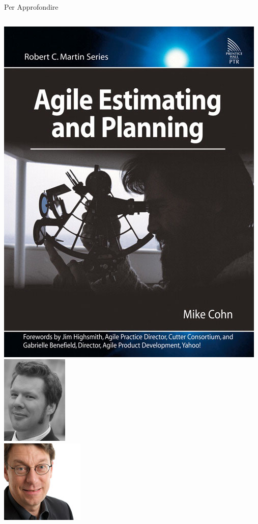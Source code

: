 \begin{frame}{Per Approfondire}
\begin{columns}[T]
\begin{column}{.2\textwidth}
				\hspace*{0.07cm} \includegraphics[scale=0.09]{images/book-2} \\
				\vspace*{0.05cm}
				\hspace*{0.35cm} \includegraphics[scale=0.3]{images/book-3} \\
				\vspace*{0.05cm}
				\hspace*{0.1cm} \includegraphics[scale=0.4]{images/book-4}
		    \end{column}
		\end{columns}
		

\end{frame}

